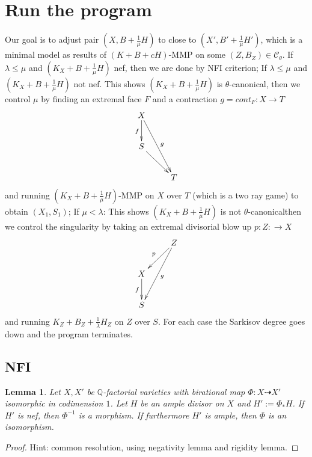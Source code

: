 \documentclass{article}
\newtheorem{lem}[defn]{Lemma}
\begin{document}
\section{Run the program}
Our goal is to adjust pair $ (X,B+\frac{1}{\mu}H) $ to close to $ (X',B'+\frac{1}{\mu}H') $, which is a minimal model as results of $ (K+B+cH) $-MMP on some $ (Z,B_Z)\in \mathcal{C}_\theta $. If $ \lambda \leqslant \mu $ and $ (K_X+B+\frac{1}{\mu} H) $  nef, then we are done by NFI criterion; If $ \lambda \leqslant \mu $ and $ (K_X+B+\frac{1}{\mu} H) $  not nef. This shows $ (K_X+B+\frac{1}{\mu} H) $ is $ \theta $-canonical, then we control $ \mu $ by  finding an extremal face $ F $ and a contraction $ g=cont_F:X\to T $
$$ \xymatrix{
  X\ar[d]_f\ar[ddr]^g&\\
  S\ar[dr]&\\
  &T }$$
and  running $ (K_X+B+\frac{1}{\mu} H) $-MMP on $ X $ over $ T $ (which is  a two ray game) to obtain $ (X_1,S_1) $; If $ \mu <\lambda $: This shows $ (K_X+B+\frac{1}{\mu} H) $ is not  $ \theta $-canonicalthen we control the singularity by taking an extremal divisorial blow up $ p:Z:\to X $ 
$$ \xymatrix{
  &Z\ar[ld]_p\ar[ldd]^g\\
  X\ar[d]_f&\\
  S} $$
and running $ K_Z+B_Z+\frac{1}{\lambda}H_Z $ on $  Z $ over $ S $. For each case the Sarkisov degree goes down and the program terminates.
\subsection{NFI}

\begin{lem}\label{lem2.7}
  Let $ X,X' $ be $ \mathbb{Q} $-factorial varieties with birational map $ \Phi:X\dashrightarrow X' $ isomorphic in codimension $ 1 $. Let $ H $ be an ample divisor on $ X $ and $ H':=\Phi_*H $. If $ H' $ is nef, then $ \Phi^{-1} $ is a morphism. If furthermore $ H' $ is ample, then $ \Phi $ is an isomorphism.
\end{lem}

\begin{proof}
  Hint: common resolution, using negativity lemma and rigidity lemma.
\end{proof}
\end{document}
